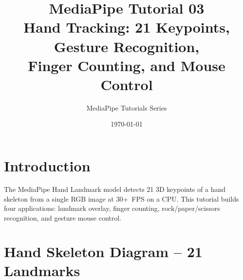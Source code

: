 \documentclass[12pt,a4paper]{article}
\begin{document}
\title{\textbf{\textcolor{mpblue}{MediaPipe Tutorial 03}}\\[0.4em]
    \large Hand Tracking: 21 Keypoints, Gesture Recognition,\\
    Finger Counting, and Mouse Control}
\author{MediaPipe Tutorials Series}
\date{\today}
\maketitle
\tableofcontents
\newpage

\section{Introduction}

The MediaPipe Hand Landmark model detects 21 3D keypoints of a hand skeleton from a single
RGB image at 30+~FPS on a CPU. This tutorial builds four applications: landmark overlay,
finger counting, rock/paper/scissors recognition, and gesture mouse control.

\section{Hand Skeleton Diagram -- 21 Landmarks}

\bigskip
\end{document}
